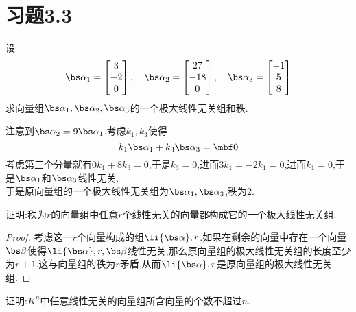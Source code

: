 \documentclass{ctexart}
\begin{document}
\section*{习题3.3}
\begin{homework}[2]
    设
    \[\bs\alpha_1=\begin{bmatrix}
        3\\-2\\0
    \end{bmatrix},\quad\bs\alpha_2=\begin{bmatrix}
        27\\-18\\0
    \end{bmatrix},\quad\bs\alpha_3=\begin{bmatrix}
        -1\\5\\8
    \end{bmatrix}\]
    求向量组$\bs\alpha_1,\bs\alpha_2,\bs\alpha_3$的一个极大线性无关组和秩.
\end{homework}
\begin{solution}
    注意到$\bs\alpha_2=9\bs\alpha_1$.考虑$k_1,k_3$使得
    \[k_1\bs\alpha_1+k_3\bs\alpha_3=\mbf0\]
    考虑第三个分量就有$0k_1+8k_3=0$,于是$k_3=0$,进而$3k_1=-2k_1=0$,进而$k_1=0$,于是$\bs\alpha_1$和$\bs\alpha_3$线性无关.\\
    于是原向量组的一个极大线性无关组为$\bs\alpha_1,\bs\alpha_3$,秩为$2$.
\end{solution}
\begin{homework}[3]
    证明:秩为$r$的向量组中任意$r$个线性无关的向量都构成它的一个极大线性无关组.
\end{homework}
\begin{proof}
    考虑这一$r$个向量构成的组$\li{\bs\alpha},r$.如果在剩余的向量中存在一个向量$\bs\beta$使得$\li{\bs\alpha},r,\bs\beta$线性无关,那么原向量组的极大线性无关组的长度至少为$r+1$.这与向量组的秩为$r$矛盾,从而$\li{\bs\alpha},r$是原向量组的极大线性无关组.
\end{proof}
\begin{homework}[4]
    证明:$K^n$中任意线性无关的向量组所含向量的个数不超过$n$.
\end{homework}
\end{document}
